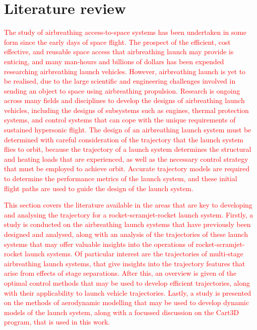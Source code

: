 
\cleardoublepage
\chapter{Literature review}\label{chapter:literature-review}


  \textcolor{red}{
  The study of airbreathing access-to-space systems has been undertaken in some form since the early days of space flight. The prospect of the efficient, cost effective, and reusable space access that airbreathing launch may provide is enticing, and many man-hours and billions of dollars has been expended researching airbreathing launch vehicles. However, airbreathing launch is yet to be realised, due to the large scientific and engineering challenges involved in sending an object to space using airbreathing propulsion. Research is ongoing across many fields and disciplines to develop the designs of airbreathing launch vehicles, including the designs of subsystems such as engines, thermal protection systems, and control systems that can cope with the unique requirements of sustained hypersonic flight. 
}
\textcolor{red}{
  The design of an airbreathing launch system must be determined with careful consideration of the trajectory that the launch system flies to orbit, because the trajectory of a launch system determines the structural and heating loads that are experienced, as well as the necessary control strategy that must be employed to achieve orbit. Accurate trajectory models are required to determine the performance metrics of the launch system, and these initial flight paths are used to guide the design of the launch system.
}



\textcolor{red}{
This section covers the literature available in the areas that are key to developing and analysing the trajectory for a rocket-scramjet-rocket launch system. 
Firstly, a study is conducted on the airbreathing launch systems that have previously been designed and analysed, along with an analysis of the trajectories of these launch systems that may offer valuable insights into the operations of rocket-scramjet-rocket launch systems. Of particular interest are the trajectories of multi-stage airbreathing launch systems, that give insights into the trajectory features that arise from effects of stage separations. 
After this, an overview is given of the optimal control methods that may be used to develop efficient trajectories, along with their applicability to launch vehicle trajectories. 
Lastly, a study is presented on the methods of aerodynamic modelling that may be used to develop dynamic models of the launch system, along with a focussed discussion on the Cart3D program, that is used in this work. 
}

